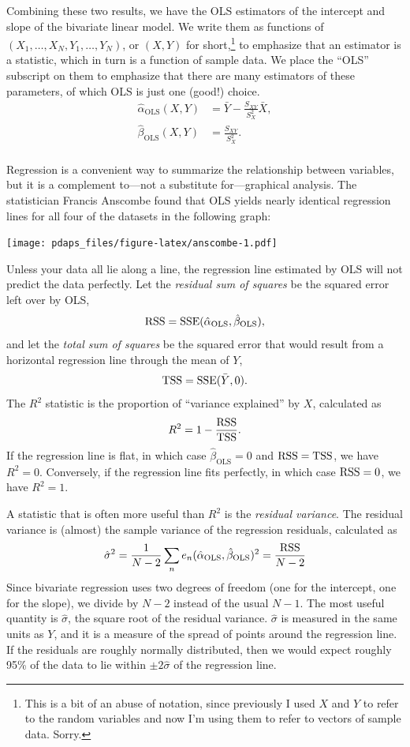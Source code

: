 \documentclass[12pt,oneside,openany]{book}
\let\rmarkdownfootnote\footnote%
\def\footnote{\protect\rmarkdownfootnote}
\begin{document}
Combining these two results, we have the OLS estimators of the intercept
and slope of the bivariate linear model. We write them as functions of
\((X_1, \ldots, X_N, Y_1, \ldots, Y_N)\), or \((X, Y)\) for
short,\footnote{This is a bit of an abuse of notation, since previously
  I used \(X\) and \(Y\) to refer to the random variables and now I'm
  using them to refer to vectors of sample data. Sorry.} to emphasize
that an estimator is a statistic, which in turn is a function of sample
data. We place the ``OLS'' subscript on them to emphasize that there are
many estimators of these parameters, of which OLS is just one (good!)
choice. \[
\begin{aligned}
\hat{\alpha}_{\text{OLS}}(X, Y)
&= \bar{Y} - \frac{S_{XY}}{S_X^2} \bar{X}, \\
\hat{\beta}_{\text{OLS}}(X, Y)
&= \frac{S_{XY}}{S_X^2}. \\
\end{aligned}
\]

Regression is a convenient way to summarize the relationship between
variables, but it is a complement to---not a substitute for---graphical
analysis. The statistician Francis Anscombe found that OLS yields nearly
identical regression lines for all four of the datasets in the following
graph:

\texttt{[image: pdaps\_files/figure-latex/anscombe-1.pdf]}

Unless your data all lie along a line, the regression line estimated by
OLS will not predict the data perfectly. Let the \emph{residual sum of
squares} be the squared error left over by OLS, \[
\mathop{\rm RSS}\nolimits = \mathop{\rm SSE}\nolimits(\hat{\alpha}_{\text{OLS}}, \hat{\beta}_{\text{OLS}}),
\] and let the \emph{total sum of squares} be the squared error that
would result from a horizontal regression line through the mean of
\(Y\), \[
\mathop{\rm TSS}\nolimits = \mathop{\rm SSE}\nolimits(\bar{Y}, 0).
\] The \(R^2\) statistic is the proportion of ``variance explained'' by
\(X\), calculated as \[
R^2 = 1 - \frac{\mathop{\rm RSS}\nolimits}{\mathop{\rm TSS}\nolimits}.
\] If the regression line is flat, in which case
\(\hat{\beta}_{\text{OLS}} = 0\) and \(\mathop{\rm RSS}\nolimits = \mathop{\rm TSS}\nolimits\), we have
\(R^2= 0\). Conversely, if the regression line fits perfectly, in which
case \(\mathop{\rm RSS}\nolimits = 0\), we have \(R^2 = 1\).

A statistic that is often more useful than \(R^2\) is the \emph{residual
variance}. The residual variance is (almost) the sample variance of the
regression residuals, calculated as \[
\hat{\sigma}^2
= \frac{1}{N - 2} \sum_n e_n(\hat{\alpha}_{\text{OLS}}, \hat{\beta}_{\text{OLS}})^2
= \frac{\mathop{\rm RSS}\nolimits}{N - 2}
\] Since bivariate regression uses two degrees of freedom (one for the
intercept, one for the slope), we divide by \(N - 2\) instead of the
usual \(N - 1\). The most useful quantity is \(\hat{\sigma}\), the
square root of the residual variance. \(\hat{\sigma}\) is measured in
the same units as \(Y\), and it is a measure of the spread of points
around the regression line. If the residuals are roughly normally
distributed, then we would expect roughly 95\% of the data to lie within
\(\pm 2 \hat{\sigma}\) of the regression line.
\end{document}
